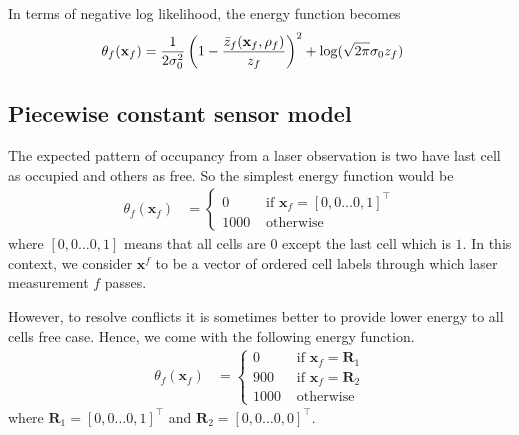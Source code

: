 \documentclass[letterpaper, 10 pt, conference]{ieeeconf} %
\newcommand{\vect}[1]{\mathbf{#1}}
\begin{document}
In terms of negative log likelihood, the energy function becomes
\begin{align}
  \theta_f(\vect{x}_f) &= \frac{1}{2\sigma_0^2}\left(1 -
  \frac{\actz}{z_f}\right)^2 + \log(\sqrt{2\pi}\sigma_0z_f)
\end{align}

\subsection{Piecewise constant sensor model}
The expected pattern of occupancy from a laser observation is two have last cell as occupied and others as free. So the simplest energy function would be 
\begin{align}
  \theta_f(\vect{x}_f) &= \begin{cases}
              0 & \text{ if } \vect{x}_f = [0, 0 \dots 0, 1]^\top\\
           1000 & \text{ otherwise}
  \end{cases}
\end{align}
where $[0, 0 \dots 0, 1]$ means that all cells are $0$ except the last cell which is $1$. In this context, we consider $\vect{x}^f$ to be a vector of ordered cell labels through which laser measurement $f$ passes.

However, to resolve conflicts it is sometimes better to provide lower energy to all cells free case. Hence, we come with the following energy function.
\begin{align}
  \theta_f(\vect{x}_f) &= \begin{cases}
                     0 & \text{ if } \vect{x}_f = \vect{R}_1\\
                   900 & \text{ if } \vect{x}_f = \vect{R}_2\\
                  1000 & \text{ otherwise}
  \end{cases}
  \label{eq:piecewiseconstant}
\end{align}
where $\vect{R}_1 = [0, 0 \dots 0, 1]^\top$ and $\vect{R}_2 = [0, 0 \dots 0, 0]^\top$.
\end{document}
